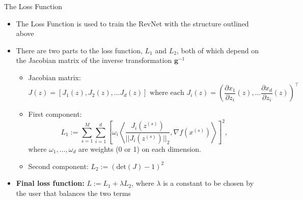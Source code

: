 \documentclass[10pt]{beamer}
\begin{document}
\begin{frame}{The Loss Function}
\begin{itemize}
    \item The Loss Function is used to train the RevNet with the structure outlined above
    \item There are two parts to the loss function, $L_1$ and $L_2$, both of which depend on the Jacobian matrix of the inverse transformation $\bm{g}^{-1}$
    \begin{itemize}
        \item Jacobian matrix: $$J(z)=[J_1(z),J_2(z),\dots J_d(z)] \mbox{ where each } J_i(z)=\left (\frac{\partial x_1}{\partial z_i}(z),\dots \frac{\partial x_d}{\partial z_i}(z) \right )^\top$$
        \item First component: $$L_1:=\sum_{s=1}^{M}\sum_{i=1}^{d}  \left[ \omega_i \left \langle \frac{J_i(z^{(s)})}{||J_i(z^{(s)})||_2}, \nabla f(x^{(s)})\right \rangle \right]^2,$$ where $\omega_1, \dots, \omega_d$ are weights (0 or 1) on each dimension.  
        \item Second component: $L_2:=(\mbox{det}(J)-1)^2$
    \end{itemize}
    \item \textbf{Final loss function:} $L:=L_1+\lambda L_2$, where $\lambda$ is a constant to be chosen by the user that balances the two terms 
\end{itemize}
\end{frame}
\end{document}
